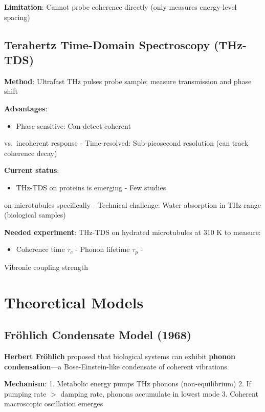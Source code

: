 \textbf{Limitation}: Cannot probe coherence directly (only measures
energy-level spacing)

\subsection{Terahertz Time-Domain Spectroscopy (THz-TDS)}\label{terahertz-time-domain-spectroscopy-thz-tds-emerging}

\textbf{Method}: Ultrafast THz pulses probe sample; measure transmission
and phase shift

\textbf{Advantages}:
\begin{itemize}
\item Phase-sensitive: Can detect coherent
\end{itemize}

vs.~incoherent response - Time-resolved: Sub-picosecond resolution (can
track coherence decay)

\textbf{Current status}:
\begin{itemize}
\item THz-TDS on proteins is emerging - Few studies
\end{itemize}

on microtubules specifically - Technical challenge: Water absorption in
THz range (biological samples)

\textbf{Needed experiment}: THz-TDS on hydrated microtubules at 310 K to
measure:
\begin{itemize}
\item Coherence time \(\tau_c\) - Phonon lifetime \(\tau_p\) -
\end{itemize}

Vibronic coupling strength



\section{Theoretical Models}\label{theoretical-models}

\subsection{Fröhlich Condensate Model (1968)}\label{fruxf6hlich-condensate-model-1968}

\textbf{Herbert Fröhlich} proposed that biological systems can exhibit
\textbf{phonon condensation}---a Bose-Einstein-like condensate of
coherent vibrations.

\textbf{Mechanism}: 1. Metabolic energy pumps THz phonons
(non-equilibrium) 2. If pumping rate $>${} damping rate,
phonons accumulate in lowest mode 3. Coherent macroscopic oscillation
emerges

